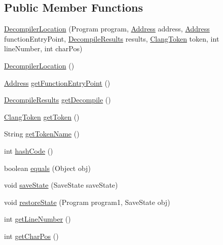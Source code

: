 \subsection*{Public Member Functions}
\begin{DoxyCompactItemize}
\item 
\mbox{\hyperlink{classghidra_1_1app_1_1decompiler_1_1_decompiler_location_a5c86c9169222bc1b6e57e42cfe5bb80c}{Decompiler\+Location}} (Program program, \mbox{\hyperlink{class_address}{Address}} address, \mbox{\hyperlink{class_address}{Address}} function\+Entry\+Point, \mbox{\hyperlink{classghidra_1_1app_1_1decompiler_1_1_decompile_results}{Decompile\+Results}} results, \mbox{\hyperlink{classghidra_1_1app_1_1decompiler_1_1_clang_token}{Clang\+Token}} token, int line\+Number, int char\+Pos)
\item 
\mbox{\hyperlink{classghidra_1_1app_1_1decompiler_1_1_decompiler_location_addd0bff6b1fff762ca8c0aadd7c5e213}{Decompiler\+Location}} ()
\item 
\mbox{\hyperlink{class_address}{Address}} \mbox{\hyperlink{classghidra_1_1app_1_1decompiler_1_1_decompiler_location_a4e664b7c1bb1def0c4a6d0eeed85b5fc}{get\+Function\+Entry\+Point}} ()
\item 
\mbox{\hyperlink{classghidra_1_1app_1_1decompiler_1_1_decompile_results}{Decompile\+Results}} \mbox{\hyperlink{classghidra_1_1app_1_1decompiler_1_1_decompiler_location_ad04db77f7ed6998fdc1f48de29225d61}{get\+Decompile}} ()
\item 
\mbox{\hyperlink{classghidra_1_1app_1_1decompiler_1_1_clang_token}{Clang\+Token}} \mbox{\hyperlink{classghidra_1_1app_1_1decompiler_1_1_decompiler_location_af442b0653d6dcdaa6e706c3f69da6b04}{get\+Token}} ()
\item 
String \mbox{\hyperlink{classghidra_1_1app_1_1decompiler_1_1_decompiler_location_ac446838712c7137c3764b396d6369c29}{get\+Token\+Name}} ()
\item 
int \mbox{\hyperlink{classghidra_1_1app_1_1decompiler_1_1_decompiler_location_a512187741bb4b07d3df4a024200cc8d4}{hash\+Code}} ()
\item 
boolean \mbox{\hyperlink{classghidra_1_1app_1_1decompiler_1_1_decompiler_location_ad1ff8d6f9e348e70c96427b12bd64113}{equals}} (Object obj)
\item 
void \mbox{\hyperlink{classghidra_1_1app_1_1decompiler_1_1_decompiler_location_a6cb200c60e7365aa8ec15107720c8a52}{save\+State}} (Save\+State save\+State)
\item 
void \mbox{\hyperlink{classghidra_1_1app_1_1decompiler_1_1_decompiler_location_a4e68f5a872d7c32876f9956e7e911948}{restore\+State}} (Program program1, Save\+State obj)
\item 
int \mbox{\hyperlink{classghidra_1_1app_1_1decompiler_1_1_decompiler_location_ae891ed0069c57e51fc74ac3a78491e85}{get\+Line\+Number}} ()
\item 
int \mbox{\hyperlink{classghidra_1_1app_1_1decompiler_1_1_decompiler_location_ab30766b927c5c6a8a6b4ef2423d488a0}{get\+Char\+Pos}} ()
\end{DoxyCompactItemize}


